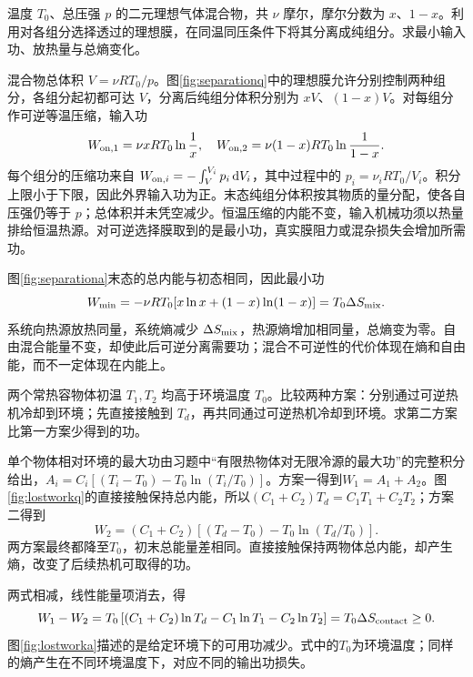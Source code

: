 \begin{example}[理想混合气体的可逆分离功]
温度 $T_0$、总压强 $p$ 的二元理想气体混合物，共 $\nu$ 摩尔，摩尔分数为 $x$、$1-x$。利用对各组分选择透过的理想膜，在同温同压条件下将其分离成纯组分。求最小输入功、放热量与总熵变化。
\end{example}
\begin{solution}
混合物总体积 $V=\nu RT_0/p$。图\ref{fig:separationq}中的理想膜允许分别控制两种组分，各组分起初都可达 $V$，分离后纯组分体积分别为 $xV$、$(1-x)V$。对每组分作可逆等温压缩，输入功
\[
 W_{\rm on,1}=\nu xRT_0\ln\frac1x,\quad
 W_{\rm on,2}=\nu(1-x)RT_0\ln\frac1{1-x}.
\]
每个组分的压缩功来自 $W_{{\rm on},i}=-\int_V^{V_i}p_i\mathop{}\!\mathrm d V_i$，其中过程中的 $p_i=\nu_iRT_0/V_i$。积分上限小于下限，因此外界输入功为正。末态纯组分体积按其物质的量分配，使各自压强仍等于 $p$；总体积并未凭空减少。恒温压缩的内能不变，输入机械功须以热量排给恒温热源。对可逆选择膜取到的是最小功，真实膜阻力或混杂损失会增加所需功。

图\ref{fig:separationa}末态的总内能与初态相同，因此最小功
\[
 W_{\min}=-\nu RT_0[x\ln x+(1-x)\ln(1-x)]
 =T_0\Delta S_{\rm mix}.
\]
系统向热源放热同量，系统熵减少 $\Delta S_{\rm mix}$，热源熵增加相同量，总熵变为零。自由混合能量不变，却使此后可逆分离需要功；混合不可逆性的代价体现在熵和自由能，而不一定体现在内能上。
\end{solution}

\begin{example}[直接传热损失的可用功]
两个常热容物体初温 $T_1,T_2$ 均高于环境温度 $T_0$。比较两种方案：分别通过可逆热机冷却到环境；先直接接触到 $T_d$，再共同通过可逆热机冷却到环境。求第二方案比第一方案少得到的功。
\end{example}
\begin{solution}
单个物体相对环境的最大功由习题中“有限热物体对无限冷源的最大功”的完整积分给出，$A_i=C_i[(T_i-T_0)-T_0\ln(T_i/T_0)]$。方案一得到$W_1=A_1+A_2$。图\ref{fig:lostworkq}的直接接触保持总内能，所以$(C_1+C_2)T_d=C_1T_1+C_2T_2$；方案二得到
\[
 W_2=(C_1+C_2)[(T_d-T_0)-T_0\ln(T_d/T_0)].
\]
两方案最终都降至$T_0$，初末总能量差相同。直接接触保持两物体总内能，却产生熵，改变了后续热机可取得的功。

两式相减，线性能量项消去，得
\[
 W_1-W_2=T_0\left[(C_1+C_2)\ln T_d-C_1\ln T_1-C_2\ln T_2\right]
 =T_0\Delta S_{\rm contact}\ge0.
\]
图\ref{fig:lostworka}描述的是给定环境下的可用功减少。式中的$T_0$为环境温度；同样的熵产生在不同环境温度下，对应不同的输出功损失。
\end{solution}

